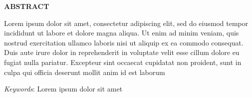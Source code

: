 \thispagestyle{plain}
\begin{center}
\textbf{\textbf{\fontsize{16pt}{24pt}\selectfont ABSTRACT}}
\end{center}

\vspace{0.3cm}


\fontsize{12pt}{18pt}\selectfont Lorem ipsum dolor sit amet, consectetur adipiscing elit, sed do eiusmod tempor incididunt ut labore et dolore magna aliqua. Ut enim ad minim veniam, quis nostrud exercitation ullamco laboris nisi ut aliquip ex ea commodo consequat. Duis aute irure dolor in reprehenderit in voluptate velit esse cillum dolore eu fugiat nulla pariatur. Excepteur sint occaecat cupidatat non proident, sunt in culpa qui officia deserunt mollit anim id est laborum


\textit{Keywords}: Lorem ipsum dolor sit amet

\newpage